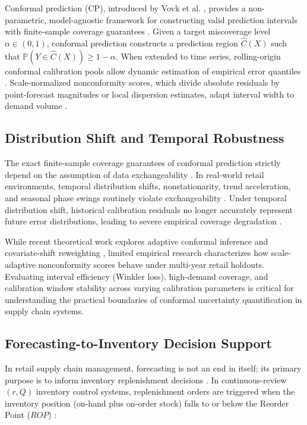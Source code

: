 Conformal prediction (CP), introduced by Vovk et al. \cite{vovk2005algorithmic}, provides a non-parametric, model-agnostic framework for constructing valid prediction intervals with finite-sample coverage guarantees \cite{angelopoulos2021gentle}. Given a target miscoverage level $\alpha \in (0, 1)$, conformal prediction constructs a prediction region $\hat{C}(X)$ such that $\mathbb{P}(Y \in \hat{C}(X)) \ge 1 - \alpha$. When extended to time series, rolling-origin conformal calibration pools allow dynamic estimation of empirical error quantiles \cite{stankeviciute2021conformal, huber2019integrating}. Scale-normalized nonconformity scores, which divide absolute residuals by point-forecast magnitudes or local dispersion estimates, adapt interval width to demand volume \cite{angelopoulos2021gentle}.

\subsection{Distribution Shift and Temporal Robustness}
The exact finite-sample coverage guarantees of conformal prediction strictly depend on the assumption of data exchangeability \cite{vovk2005algorithmic, angelopoulos2021gentle}. In real-world retail environments, temporal distribution shifts, nonstationarity, trend acceleration, and seasonal phase swings routinely violate exchangeability \cite{barber2023conformal}. Under temporal distribution shift, historical calibration residuals no longer accurately represent future error distributions, leading to severe empirical coverage degradation \cite{tibshirani2019conformal, gibbs2021adaptive}.

While recent theoretical work explores adaptive conformal inference and covariate-shift reweighting \cite{tibshirani2019conformal, gibbs2021adaptive}, limited empirical research characterizes how scale-adaptive nonconformity scores behave under multi-year retail holdouts. Evaluating interval efficiency (Winkler loss), high-demand coverage, and calibration window stability across varying calibration parameters is critical for understanding the practical boundaries of conformal uncertainty quantification in supply chain systems.

\subsection{Forecasting-to-Inventory Decision Support}
In retail supply chain management, forecasting is not an end in itself; its primary purpose is to inform inventory replenishment decisions \cite{syntetos2016supply, huber2019integrating}. In continuous-review $(r, Q)$ inventory control systems, replenishment orders are triggered when the inventory position (on-hand plus on-order stock) falls to or below the Reorder Point ($ROP$) \cite{axsaeter2015inventory, snyder2019fundamentals}:

